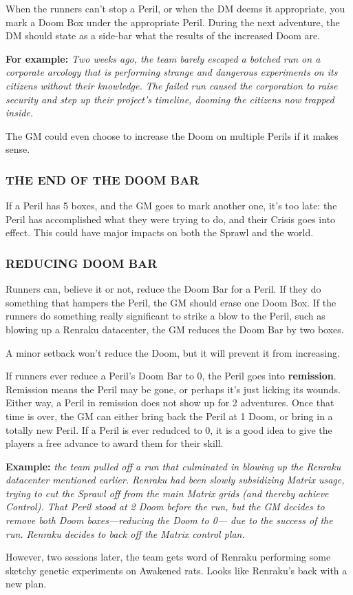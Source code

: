 \documentclass[oneside,10pt]{article}
\begin{document}
\begin{multicols}{2}
When the runners can’t stop a Peril, or when the DM deems
it appropriate, you mark a Doom Box under the appropriate
Peril. During the next adventure, the DM should state as a
side-bar what the results of the increased Doom are.
\begin{dent}

\textbf{For example:}\textit{ Two weeks ago, the team barely escaped
a botched run on a corporate arcology that is performing
strange and dangerous experiments on its citizens without
their knowledge. The failed run caused the corporation to
raise security and step up their project’s timeline, dooming
the citizens now trapped inside.}
\end{dent}
The GM could even choose to increase the Doom on multiple
Perils if it makes sense.

\subsubsection{THE END OF THE DOOM BAR}
If a Peril has 5 boxes, and the GM goes to mark another one,
it’s too late: the Peril has accomplished what they were trying
to do, and their Crisis goes into effect. This could have major
impacts on both the Sprawl and the world.

\subsubsection{REDUCING DOOM BAR}
Runners can, believe it or not, reduce the Doom Bar for a
Peril. If they do something that hampers the Peril, the GM
should erase one Doom Box. If the runners do something
really significant to strike a blow to the Peril, such as blowing
up a Renraku datacenter, the GM reduces the Doom Bar by
two boxes.

A minor setback won’t reduce the Doom, but it will prevent
it from increasing.

If runners ever reduce a Peril’s Doom Bar to 0, the Peril goes
into \textbf{remission}. Remission means the Peril may be gone, or
perhaps it’s just licking its wounds. Either way, a Peril in remission does not show up for 2 adventures. Once that time
is over, the GM can either bring back the Peril at 1 Doom, or
bring in a totally new Peril. If a Peril is ever redudced to 0, it
is a good idea to give the players a free advance to award
them for their skill.
\begin{dent}

\textbf{Example:} \textit{the team pulled off a run that culminated in blowing up the Renraku datacenter mentioned earlier. Renraku
had been slowly subsidizing Matrix usage, trying to cut the
Sprawl off from the main Matrix grids (and thereby achieve
Control). That Peril stood at 2 Doom before the run, but
the GM decides to remove both Doom boxes—reducing
the Doom to 0— due to the success of the run. Renraku
decides to back off the Matrix control plan.}
\end{dent}
However, two sessions later, the team gets word of Renraku
performing some sketchy genetic experiments on Awakened
rats. Looks like Renraku’s back with a new plan.


\end{multicols}
\end{document}
